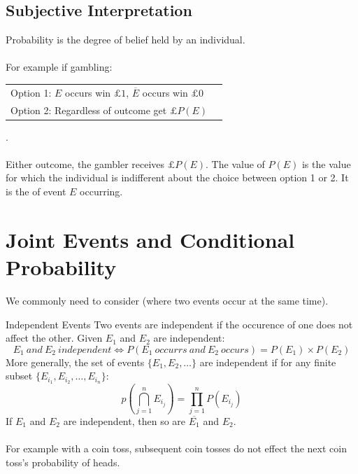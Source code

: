 \subsection{Subjective Interpretation}
Probability is the degree of belief held by an individual.
\\
\\ For example if gambling: \begin{tabular}{l l}
	Option 1: $E$ occurs win $\pounds 1$, $\overline{E}$ occurs win $\pounds 0$ \\
	Option 2: Regardless of outcome get $\pounds P(E)$                   \\
\end{tabular}.
\\
\\ Either outcome, the gambler receives $\pounds P(E)$. The value of $P(E)$ is the value for which the individual is indifferent about the choice between option 1 or 2. It is the  of event $E$ occurring.


\section{Joint Events and Conditional Probability}
We commonly need to consider  (where two events occur at the same time).
\begin{definitionbox}{Independent Events}
    Two events are independent if the occurence of one does not affect the other. Given $E_1$ and $E_2$ are independent:
    \[E_1 \ and \ E_2 \ independent \Leftrightarrow P(E_1 \ occurrs \ and \ E_2 \ occurs) = P(E_1) \times P(E_2)\]
    More generally, the set of events $\{E_1, E_2, \dots\}$ are independent if for any finite subset $\{E_{i_1}, E_{i_2}, \dots, E_{i_n}\}$:
    \[p(\bigcap_{j=1}^{n}E_{i_j}) = \prod_{j=1}^n P(E_{i_j}) \]
    If $E_1$ and $E_2$ are independent, then so are $\overline{E_1}$ and $E_2$.
    \\
    \\For example with a coin toss, subsequent coin tosses do not effect the next coin toss's probability of heads.
\end{definitionbox}

